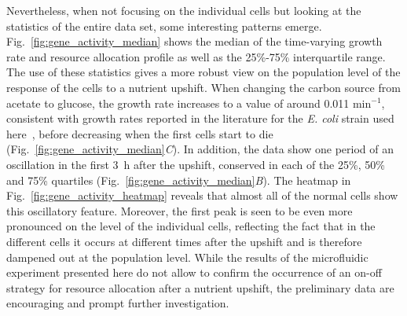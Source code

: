 Nevertheless, when not focusing on the individual cells but looking at the statistics of the entire data set, some interesting patterns emerge. 
Fig.~\ref{fig:gene_activity_median} shows the median of the time-varying growth rate and resource allocation profile as well as the 25\%-75\% interquartile range. 
The use of these statistics gives a more robust view on the population level of the response of the cells to a nutrient upshift. 
When changing the carbon source from acetate to glucose, the growth rate increases to a value of around 0.011 min$^{-1}$, consistent with growth rates reported in the literature for the \textit{E. coli} strain used here~\cite{volkmer_condition-dependent_2011,izard_synthetic_2015}, before decreasing when the first cells start to die (Fig.~\ref{fig:gene_activity_median}\textit{C}).
In addition, the data show one period of an oscillation in the first 3~h after the upshift, conserved in each of the 25\%, 50\% and 75\% quartiles (Fig.~\ref{fig:gene_activity_median}\textit{B}).
The heatmap in Fig.~\ref{fig:gene_activity_heatmap} reveals that almost all of the normal cells show this oscillatory feature.
Moreover, the first peak is seen to be even more pronounced on the level of the individual cells, reflecting the fact that in the different cells it occurs at different times after the upshift and is therefore dampened out at the population level.
While the results of the microfluidic experiment presented here do not allow to confirm the occurrence of an on-off strategy for resource allocation after a nutrient upshift, the preliminary data are encouraging and prompt further investigation.

